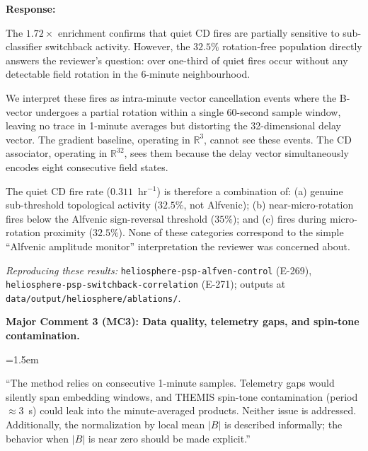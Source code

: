 \documentclass{article}
\newenvironment{reviewcomment}[1]{%
  \vspace{0.5em}
  \noindent\textbf{#1}\par\vspace{0.2em}
  \begin{list}{}{\leftmargin=1.5em}\item\itshape
}{%
  \end{list}\vspace{0.5em}
}
\newenvironment{authorresponse}{%
  \vspace{0.3em}
  \noindent\textbf{Response:}\hspace{0.5em}
}{%
  \vspace{0.5em}\par
}
\begin{document}
\begin{authorresponse}
The $1.72\times$ enrichment confirms that quiet CD fires are partially
sensitive to sub-classifier switchback activity.  However, the $32.5\%$
rotation-free population directly answers the reviewer's question: over
one-third of quiet fires occur without any detectable field rotation in
the 6-minute neighbourhood.

We interpret these fires as intra-minute vector cancellation events where
the B-vector undergoes a partial rotation within a single 60-second sample
window, leaving no trace in 1-minute averages but distorting the 32-dimensional
delay vector.  The gradient baseline, operating in $\mathbb{R}^3$, cannot see
these events.  The CD associator, operating in $\mathbb{R}^{32}$, sees them
because the delay vector simultaneously encodes eight consecutive field states.

The quiet CD fire rate ($0.311$~hr$^{-1}$) is therefore a combination of:
(a) genuine sub-threshold topological activity ($32.5\%$, not Alfvenic);
(b) near-micro-rotation fires below the Alfvenic sign-reversal threshold
($35\%$); and (c) fires during micro-rotation proximity ($32.5\%$).
None of these categories correspond to the simple ``Alfvenic amplitude
monitor'' interpretation the reviewer was concerned about.
\end{authorresponse}

\smallskip\noindent\textit{Reproducing these results:}
\texttt{heliosphere-psp-alfven-control} (E-269),
\texttt{heliosphere-psp-switchback-correlation} (E-271);
outputs at \texttt{data/output/heliosphere/ablations/}.

\begin{reviewcomment}{Major Comment 3 (MC3): Data quality, telemetry gaps, and spin-tone contamination.}
``The method relies on consecutive 1-minute samples.  Telemetry gaps would
silently span embedding windows, and THEMIS spin-tone contamination (period
$\approx 3$~s) could leak into the minute-averaged products.  Neither issue
is addressed.  Additionally, the normalization by local mean $|B|$ is
described informally; the behavior when $|B|$ is near zero should be made
explicit.''
\end{reviewcomment}
\end{document}
